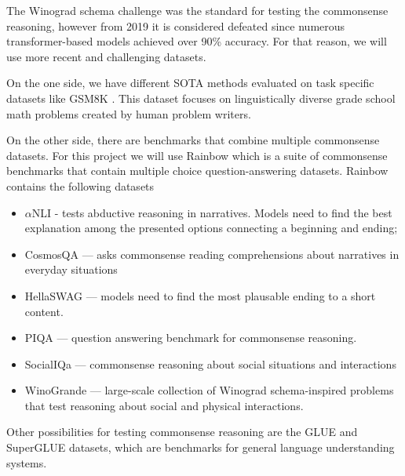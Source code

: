 \documentclass[fleqn,moreauthors,10pt]{ds_report}
\begin{document}
The Winograd schema challenge \cite{levesque2012winograd} was the standard for testing the commonsense reasoning, however from 2019 it is considered defeated since numerous transformer-based models achieved over 90\% accuracy. \cite{beaten_winograd}
For that reason, we will use more recent and challenging datasets.

On the one side, we have different SOTA methods \cite{CoT} evaluated on task specific datasets like GSM8K \cite{GSMK8}. This dataset focuses on linguistically diverse grade school math problems created by human problem writers.

On the other side, there are benchmarks that combine multiple commonsense datasets. For this project we will use Rainbow which is a suite of commonsense benchmarks that contain multiple choice question-answering datasets.
Rainbow contains the following datasets

\begin{itemize}
    \item $\alpha$NLI \cite{alphaNLI} - tests abductive reasoning in narratives. Models need to find the best explanation among the presented options connecting a beginning and ending;
    \item  CosmosQA \cite{Tian2020} — asks commonsense reading comprehensions about narratives in everyday situations
    \item HellaSWAG \cite{Zellers2020} — models need to find the most plausable ending to a short content.
    \item PIQA \cite{Bisk2020} — question answering benchmark for commonsense reasoning.
    \item SocialIQa \cite{socialIQA} — commonsense reasoning about social situations and interactions
    \item WinoGrande \cite{WinoGRANDE} — large-scale collection of Winograd schema-inspired problems that test reasoning about social and physical interactions.
\end{itemize}

Other possibilities for testing commonsense reasoning are the GLUE \cite{GLUE} and SuperGLUE \cite{supeglue} datasets, which are benchmarks for general language understanding systems.





\end{document}
